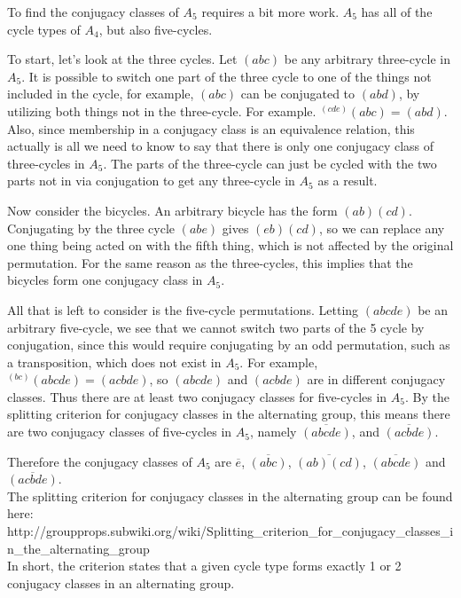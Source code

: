 \documentclass{scrartcl}
\begin{document}
To find the conjugacy classes of $A_5$ requires a bit more work. $A_5$ has all of the cycle types of $A_4$, but also five-cycles.

To start, let's look at the three cycles. Let $(abc)$ be any arbitrary three-cycle in $A_5$. It is possible to switch one part of the three cycle to one of the things not included in the cycle, for example, $(abc)$ can be conjugated to $(abd)$, by utilizing both things not in the three-cycle. For example. $^{(cde)}(abc)=(abd)$. Also, since membership in a conjugacy class is an equivalence relation, this actually is all we need to know to say that there is only one conjugacy class of three-cycles in $A_5$. The parts of the three-cycle can just be cycled with the two parts not in via conjugation to get any three-cycle in $A_5$ as a result.

Now consider the bicycles. An arbitrary bicycle has the form $(ab)(cd)$. Conjugating by the three cycle $(abe)$ gives $(eb)(cd)$, so we can replace any one thing being acted on with the fifth thing, which is not affected by the original permutation. For the same reason as the three-cycles, this implies that the bicycles form one conjugacy class in $A_5$.

All that is left to consider is the five-cycle permutations. Letting $(abcde)$ be an arbitrary five-cycle, we see that we cannot switch two parts of the 5 cycle by conjugation, since this would require conjugating by an odd permutation, such as a transposition, which does not exist in $A_5$. For example, $^{(bc)}(abcde)=(acbde)$, so $(abcde)$ and $(acbde)$ are in different conjugacy classes. Thus there are at least two conjugacy classes for five-cycles in $A_5$. By the splitting criterion for conjugacy classes in the alternating group, this means there are two conjugacy classes of five-cycles in $A_5$, namely $\overline{(abcde)}$, and $\overline{(acbde)}$.

Therefore the conjugacy classes of $A_5$ are $\overline{e}$, $\overline{(abc)}$, $\overline{(ab)(cd)}$, $\overline{(abcde)}$ and $\overline{(acbde)}$.\\

The splitting criterion for conjugacy classes in the alternating group can be found here:\\
http://groupprops.subwiki.org/wiki/Splitting\_criterion\_for\_conjugacy\_classes\_in\_the\_alternating\_group\\

In short, the criterion states that a given cycle type forms exactly 1 or 2 conjugacy classes in an alternating group.\\
\end{document}
